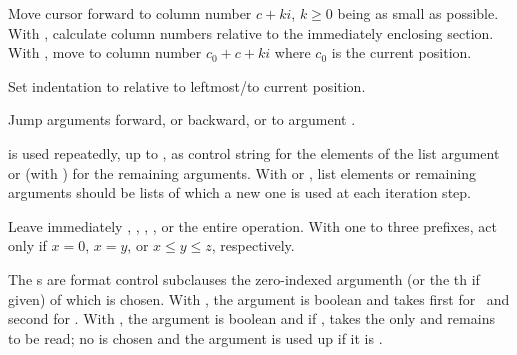 \begin{LIST}{1cm}
\begin{LIST}{.5cm}
    {
    Move cursor forward to column number $c + ki$, $k \geq 0$ being as small
    as possible. With \kwd{:}, calculate column numbers relative to
    the immediately enclosing section. With , move to column
    number $c_0 + c + ki$ where $c_0$ is the current position.
  }

    {
      Set indentation to  relative to leftmost/to current
      position. 
  }

  {
    Jump  arguments forward, or backward, or to argument .
  }

    {
     is used repeatedly, up to , as control
    string for the elements of the list argument or (with
    ) for the remaining arguments. With \kwd{:} or ,
    list elements or remaining arguments should be
    lists of which a new one is used at each iteration step.
  }

    {
    Leave immediately \kwd{\TLD\boldmath{$<$} \TLD\boldmath{$>$}},
    \kwd{\TLD\boldmath{$<$} \TLD:\boldmath{$>$}}, 
    \kwd{\TLD\boldmath{$\{$} \TLD\boldmath{$\}$}}, , or the
    entire  operation. With one to three prefixes, act only
    if $x=0$, $x=y$, or $x\leq y \leq z$, respectively.
  }

    {
    The s are format control subclauses the zero-indexed argumenth (or the
    th if given) of which is chosen. With \kwd{:}, the argument
    is boolean and takes first  for \NIL\ and second
     for \T. With , the argument is boolean and if \T, takes
    the only  and remains to be read; no  is
    chosen and the argument is used up if it is \NIL.
  }


\end{LIST}
\end{LIST}
